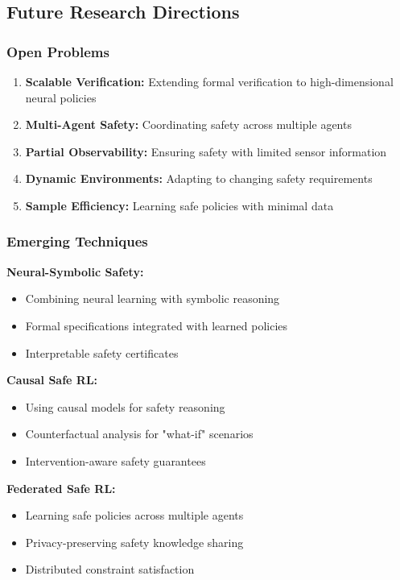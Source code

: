 \documentclass[12pt]{article}
\begin{document}
{{{{\subsection{Future Research Directions}

\subsubsection{Open Problems}

\begin{enumerate}
\item \textbf{Scalable Verification:} Extending formal verification to high-dimensional neural policies
\item \textbf{Multi-Agent Safety:} Coordinating safety across multiple agents
\item \textbf{Partial Observability:} Ensuring safety with limited sensor information
\item \textbf{Dynamic Environments:} Adapting to changing safety requirements
\item \textbf{Sample Efficiency:} Learning safe policies with minimal data
\end{enumerate}

\subsubsection{Emerging Techniques}

\textbf{Neural-Symbolic Safety:}
\begin{itemize}
\item Combining neural learning with symbolic reasoning
\item Formal specifications integrated with learned policies
\item Interpretable safety certificates
\end{itemize}

\textbf{Causal Safe RL:}
\begin{itemize}
\item Using causal models for safety reasoning
\item Counterfactual analysis for "what-if" scenarios
\item Intervention-aware safety guarantees
\end{itemize}

\textbf{Federated Safe RL:}
\begin{itemize}
\item Learning safe policies across multiple agents
\item Privacy-preserving safety knowledge sharing
\item Distributed constraint satisfaction
\end{itemize}

}}}}
\end{document}
